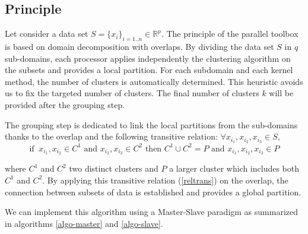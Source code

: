 \documentclass{llncs}
\begin{document}
\subsection{Principle}
Let consider a data set $S=\{x_i\}_{i=1..n}\in \mathbb{R}^p$. 
The principle of the parallel toolbox is based on domain decomposition with
overlaps. By dividing the data set $S$ in $q$ sub-domains, each processor
applies independently the clustering algorithm on the subsets and provides a
local partition. For each subdomain and each kernel method, the number of
clusters is automatically determined. This heuristic avoids us to fix the
targeted number of clusters.
The final number of clusters $k$ will be provided
after the grouping step. 

The grouping step is dedicated to link the local
partitions from the sub-domains thanks to the overlap  and the
following transitive relation: $\forall x_{i_1}, x_{i_2}, x_{i_3} \in S,$
\vspace{-0.4cm}
\begin{equation}
  \text{if } \ x_{i_1},x_{i_2} \in C^1  \text{ and }  x_{i_2}, x_{i_3} \in C^2 \text{ then } C^1 \cup C^2 = P \text{ and } x_{i_1},x_{i_2}, x_{i_3} \in P \label{reltrans}
\end{equation}

where $C^1$ and $C^2$ two distinct clusters and $P$ a
larger cluster which includes both $C^1$ and $C^2$.  By applying this
transitive relation (\ref{reltrans})  on the overlap, the
connection between subsets of data is established and provides a global
partition.

We can implement this algorithm using a Master-Slave paradigm as summarized in
algorithms \ref{algo-master} and \ref{algo-slave}.

\vspace{-0.5cm}
\end{document}
